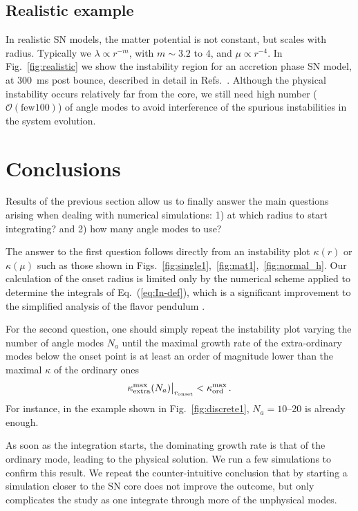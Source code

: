 \documentclass[twocolumn,prd,showpacs,
floatfix,preprintnumbers,nofootinbib]{revtex4}
\begin{document}
\subsection{Realistic example}

In realistic SN models, the matter potential is not constant, but scales with radius. Typically we $\lambda \propto r^{-m}$, with $m\sim 3.2\text{ to }4$, and $\mu\propto r^{-4}$. In Fig.~\ref{fig:realistic} we show the instability region for an accretion phase SN model, at 300~ms post bounce, described in detail in Refs.~\cite{Chakraborty:2011gd, Sarikas:2011jc}.
Although the physical instability occurs relatively far from the core, we still need high number ($\mathcal{O}(\text{few} 100)$) of angle modes to avoid interference of the spurious instabilities in the system evolution.

\section{Conclusions}

Results of the previous section allow us to finally answer the main questions arising when dealing with numerical simulations: 1) at which radius to start integrating? and 2) how many angle modes to use?

The answer to the first question follows directly from an instability plot $\kappa(r)$ or $\kappa(\mu)$ such as those shown in Figs.~\ref{fig:single1},~\ref{fig:mat1},~\ref{fig:normal_h}.
Our calculation of the onset radius is limited only by the numerical scheme applied to determine the integrals of Eq.~(\ref{eq:In-def}), which is a significant improvement to the simplified analysis of the flavor pendulum \cite{Hannestad:2006nj, Duan:2007mv}.

For the second question, one should simply repeat the instability plot varying the number of angle modes $N_a$ until the maximal growth rate of the extra-ordinary modes below the onset point is at least an order of magnitude lower than the maximal $\kappa$ of the ordinary ones
\begin{equation}
\left.\kern-\nulldelimiterspace
\kappa^{\rm{max}}_{\rm{extra}}(N_a)
\vphantom{\big|}\right|
_{r_{\rm{onset}}} < 
\kappa^{\rm{max}}_{\rm{ord}}\,.
\end{equation}
For instance, in the example shown in Fig.~\ref{fig:discrete1}, $N_a=10$--20 is already enough.

As soon as the integration starts, the dominating growth rate is that of the ordinary mode, leading to the physical solution.
We run a few simulations to confirm this result.
We repeat the counter-intuitive conclusion that by starting a simulation  closer to the SN core does not improve the outcome, but only complicates the study as one integrate through more of the unphysical modes.
\end{document}
